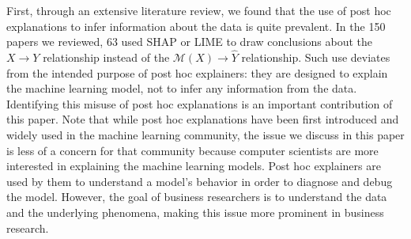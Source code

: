 \documentclass[12pt]{article}  %
\begin{document}
            First, through an extensive literature review, we found that the use of post hoc explanations to infer information about the data is quite prevalent. In the 150 papers we reviewed, 63 used SHAP or LIME to draw conclusions about the $X\rightarrow Y$ relationship instead of the $\mathcal{M}(X)\rightarrow \hat{Y}$ relationship. Such use deviates from the intended purpose of post hoc explainers: they are designed to explain the machine learning model, not to infer any information from the data. Identifying this misuse of post hoc explanations is an important contribution of this paper. Note that while post hoc explanations have been first introduced and widely used in the machine learning community, the issue we discuss in this paper is less of a concern for that community because computer scientists are more interested in explaining the machine learning models. Post hoc explainers are used by them to understand a model's behavior in order to diagnose and debug the model. However, the goal of business researchers is to understand the data and the underlying phenomena, making this issue more prominent in business research.

\end{document}
